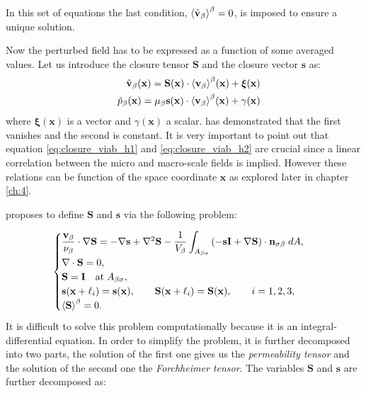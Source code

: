 In this set of equations the last condition, ${\left< \tilde{\textbf{v}}_{\beta} \right>}^{\beta} = 0$, is imposed to ensure a unique solution.

Now the perturbed field has to be expressed as a function of some averaged values. Let us introduce the closure tensor $\mathbf{S}$ and  the closure vector $\mathbf{s}$ as:
\begin{eqnarray}
&& \tilde{\textbf{v}}_{\beta}(\mathbf{x}) = \mathbf{S}(\mathbf{x})  \cdot {\left< \textbf{v}_{\beta}\right>}^{\beta}(\mathbf{x})  +\boldsymbol{\xi}(\mathbf{x})  	\label{eq:closure_viab_h1} \\
&& \tilde{p}_{\beta}(\mathbf{x})  = \mu_{\beta} \mathbf{s}(\mathbf{x})  \cdot {\left< \textbf{v}_{\beta}\right>}^{\beta}(\mathbf{x})  + \gamma(\mathbf{x}) \label{eq:closure_viab_h2}
\end{eqnarray}
where $\boldsymbol{\xi}(\mathbf{x})$ is a vector and $\gamma(\mathbf{x})$ a scalar. \citet{whitaker1996forchheimer} has demonstrated that the first vanishes and the second is constant.
It is very important to point out that equation \eqref{eq:closure_viab_h1} and \eqref{eq:closure_viab_h2} are crucial since a linear correlation between the micro and macro-scale fields is implied.
However these relations can be function of the space coordinate $\mathbf{x}$ as explored later in chapter \ref{ch:4}.

\citet{whitaker1996forchheimer} proposes to define $\mathbf{S}$ and $\mathbf{s}$ via the following problem:

\begin{eqnarray}
	\begin{cases}
		\dfrac{\textbf{v}_{\beta}}{\nu_{\beta}} \cdot  \nabla \mathbf{S} = -\nabla \mathbf{s} + \nabla^2 \mathbf{S} - \dfrac{1}{V_\beta} \displaystyle \int_{A_{\beta \sigma}} \left(-\mathbf{s}\mathbf{I}  +  \nabla \mathbf{S} \right) \cdot \mathbf{n}_{\sigma \beta} \;dA,  \\
		\nabla \cdot \mathbf{S} = 0, \\
		\mathbf{S} = \mathbf{I} \quad \textrm{at} \; A_{\beta \sigma}, \\
		\mathbf{s}(\mathbf{x} +\ell_i) = \mathbf{s}(\mathbf{x}), \qquad \mathbf{S}(\mathbf{x} +\ell_i) = \mathbf{S}(\mathbf{x}), \qquad i=1,2,3 ,\\
		{\left< \mathbf{S} \right>}^{\beta} = 0.
	\end{cases}
\label{eq:R_problem}
\end{eqnarray}
It is difficult to solve this problem computationally because it is an integral-differential equation.
In order to simplify the problem, it is further decomposed into two parts, the solution of the first one gives us the \textit{permeability tensor} and the solution of the second one the \textit{Forchheimer tensor}. The variables $\mathbf{S}$ and $\mathbf{s}$ are further decomposed as:

